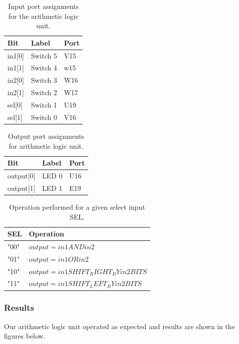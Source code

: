 \documentclass[11pt]{article}
\begin{document}
\begin{table}[H]
\begin{center}
\begin{tabular}{| l | l | l |}
	\hline
	Bit & Label & Port \\ \hline
	in1[0] &  Switch 5 & V15 \\ \hline
	in1[1] & Switch 4 & w15 \\ \hline
	in2[0] & Switch 3 & W16 \\ \hline
	in2[1] & Switch 2 & W17 \\ \hline
	sel[0] & Switch 1 & U19 \\ \hline
	sel[1] & Switch 0 & V16 \\ \hline
\end{tabular}
\caption{\label{tab:alu_input_Ports}Input port assignments for  the arithmetic logic unit.}
\end{center}
\end{table}

\begin{table}[H]
\begin{center}
\begin{tabular}{| l | l | l |}
	\hline
	Bit & Label & Port \\ \hline
	output[0] & LED 0 & U16 \\ \hline
	output[1] & LED 1 & E19 \\ \hline
\end{tabular}
\caption{\label{tab:alu_output_Ports}Output port assignments for arithmetic logic unit.}
\end{center}
\end{table}

\begin{table}[H]
\begin{center}
\begin{tabular}{| l | l |}
	\hline
	SEL & Operation \\ \hline
	"00" & $output = in1 AND in2$ \\ \hline
	"01" & $output = in1 OR in2$ \\ \hline
	"10" & $output = in1 SHIFT_RIGHT_BY in2 BITS$ \\ \hline
	"11" & $output = in1 SHIFT_LEFT_BY in2 BITS$ \\ \hline
\end{tabular}
\caption{\label{tab:alu_sel_ops}Operation performed for a given select input SEL.}
\end{center}
\end{table}

\subsubsection{Results}
Our arithmetic logic unit operated as expected and results are shown in the figures below.
\end{document}
